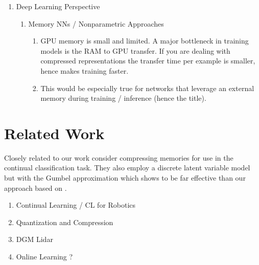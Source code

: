 \documentclass[colorinlistoftodos]{article} %
\begin{document}
\begin{enumerate}
			
				
		\item Deep Learning Perspective
			\begin{enumerate}
				\item Memory NNs / Nonparametric Approaches
				\begin{enumerate}
					\item GPU memory is small and limited. A major bottleneck in training models is the RAM to GPU transfer. If you are dealing with compressed representations the transfer time per example is smaller, hence makes training faster. 
					\item This would be especially true for networks that leverage an external memory during training / inference (hence the title). 
				\end{enumerate}		

			\end{enumerate}
 
\end{enumerate}



\section{Related Work}

Closely related to our work \cite{scalable2017} consider compressing memories for use in the continual classification task. They also employ a discrete latent variable model but with the Gumbel approximation which shows to be far effective than our approach based on \cite{VQVAE}. 
\begin{enumerate}
    \item Continual Learning / CL for Robotics
    \item Quantization and Compression
    \item DGM Lidar \citep{caccia2018deep}
    \item Online Learning ?
\end{enumerate}
\end{document}
